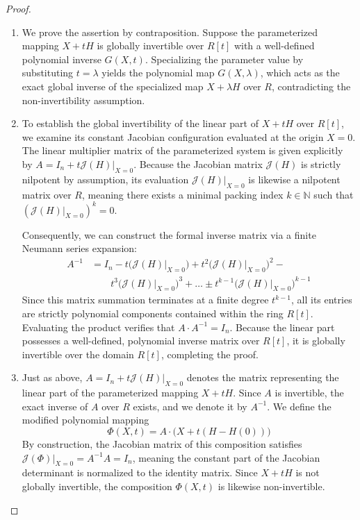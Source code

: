 \documentclass[11pt,a4paper]{article}
\begin{document}
\begin{proof}
\begin{enumerate}

    \item We prove the assertion by contraposition. Suppose the parameterized mapping $X + tH$ is globally invertible over $R[t]$ with a well-defined polynomial inverse $G(X, t)$. Specializing the parameter value by substituting $t = \lambda$ yields the polynomial map $G(X, \lambda)$, which acts as the exact global inverse of the specialized map $X + \lambda H$ over $R$, contradicting the non-invertibility assumption.
    
    \item To establish the global invertibility of the linear part of $X + tH$ over $R[t]$, we examine its constant Jacobian configuration evaluated at the origin $X = 0$. The linear multiplier matrix of the parameterized system is given explicitly by $A = I_n + t \mathcal{J}(H)\vert_{X=0}$. Because the Jacobian matrix $\mathcal{J}(H)$ is strictly nilpotent by assumption, its evaluation $\mathcal{J}(H)\vert_{X=0}$ is likewise a nilpotent matrix over $R$, meaning there exists a minimal packing index $k \in \mathbb{N}$ such that $(\mathcal{J}(H)\vert_{X=0})^k = 0$. 
    
    Consequently, we can construct the formal inverse matrix via a finite Neumann series expansion:
    \begin{align}
    A^{-1} &= I_n - t \big(\mathcal{J}(H)\big|_{X=0}\big) + t^2 \big(\mathcal{J}(H)\big|_{X=0}\big)^2 - {} \nonumber \\
    &\qquad t^3 \big(\mathcal{J}(H)\big|_{X=0}\big)^3 + \dots \pm t^{k-1} \big(\mathcal{J}(H)\big|_{X=0}\big)^{k-1}
    \end{align}
    Since this matrix summation terminates at a finite degree $t^{k-1}$, all its entries are strictly polynomial components contained within the ring $R[t]$. Evaluating the product verifies that $A \cdot A^{-1} = I_n$. Because the linear part possesses a well-defined, polynomial inverse matrix over $R[t]$, it is globally invertible over the domain $R[t]$, completing the proof.
    
    \item Just as above, $A = I_n + t \mathcal{J}(H)\vert_{X=0}$ denotes the matrix representing the linear part of the parameterized mapping $X + tH$. Since $A$ is invertible, the exact inverse of $A$ over $R$ exists, and we denote it by $A^{-1}$. We define the modified polynomial mapping 
    \[ \Phi(X, t) = A\cdot\big(X + t(H-H(0))\big)
    \]
    By construction, the Jacobian matrix of this composition satisfies $\mathcal{J}(\Phi)\vert_{X=0} = A^{-1} A = I_n$, meaning the constant part of the Jacobian determinant is normalized to the identity matrix. Since \(X + tH\) is not globally invertible, the composition $\Phi(X, t)$ is likewise non-invertible. 
    

\end{enumerate}
\end{proof}
\end{document}

